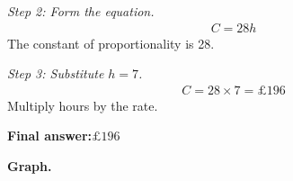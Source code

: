 \documentclass[11pt]{article}
\begin{document}
\textit{Step 2: Form the equation.}
\[\begin{gathered}
C = 28h
\end{gathered}\]
The constant of proportionality is 28.

\textit{Step 3: Substitute \( h = 7 \).}
\[\begin{gathered}
C = 28 \times 7 = \pounds 196
\end{gathered}\]
Multiply hours by the rate.

\begin{answerbox}
\textbf{Final answer:}\quad \(\displaystyle  \pounds 196 \)
\end{answerbox}
\textbf{Graph.}

\begin{center}
\end{center}
\end{document}
